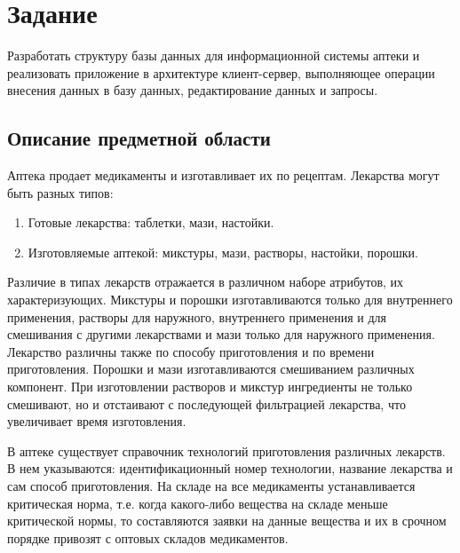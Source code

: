 \documentclass[a4paper]{article}
\begin{document}
	\thispagestyle{empty}
	
	
		
	\newpage
		
	\tableofcontents
	
	\pagestyle{plain}
	
	\newpage
	
	\section{Задание}
		Разработать структуру базы данных для информационной системы аптеки и реализовать приложение в архитектуре клиент-сервер, выполняющее операции внесения данных в базу данных, редактирование данных и запросы.
		
		\subsection{Описание предметной области}
			Аптека продает медикаменты и изготавливает их по рецептам. Лекарства могут быть разных типов:
			\begin{enumerate}
				\item Готовые лекарства: таблетки, мази, настойки.
				
				\item Изготовляемые аптекой: микстуры, мази, растворы, настойки, порошки.
			\end{enumerate}
			Различие в типах лекарств отражается в различном наборе атрибутов, их характеризующих. Микстуры и порошки изготавливаются только для внутреннего применения, растворы для наружного, внутреннего применения и для смешивания с другими лекарствами и мази только для наружного применения. Лекарство различны также по способу приготовления и по времени приготовления. Порошки и мази изготавливаются смешиванием различных компонент. При изготовлении растворов и микстур ингредиенты не только смешивают, но и отстаивают с последующей фильтрацией лекарства, что увеличивает время изготовления.
			
			В аптеке существует справочник технологий приготовления различных лекарств. В нем указываются: идентификационный номер технологии, название лекарства и сам способ приготовления. На складе на все медикаменты устанавливается критическая норма, т.е. когда какого-либо вещества на складе меньше критической нормы, то составляются заявки на данные вещества и их в срочном порядке привозят с оптовых складов медикаментов.
			
\end{document}
